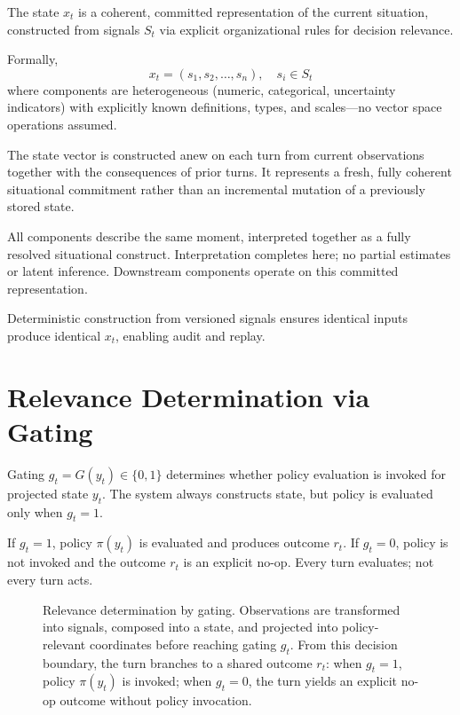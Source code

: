 \documentclass[11pt]{article}
\begin{document}
The state $x_t$ is a coherent, committed representation of the current situation, constructed from signals $S_t$ via explicit organizational rules for decision relevance.

Formally,
\begin{equation}
x_t = (s_1, s_2, \dots, s_n), \quad s_i \in S_t
\end{equation}
where components are heterogeneous (numeric, categorical, uncertainty indicators) with explicitly known definitions, types, and scales---no vector space operations assumed.

The state vector is constructed anew on each turn from current observations together with the consequences of prior turns. It represents a fresh, fully coherent situational commitment rather than an incremental mutation of a previously stored state.

All components describe the same moment, interpreted together as a fully resolved situational construct. Interpretation completes here; no partial estimates or latent inference. Downstream components operate on this committed representation.

Deterministic construction from versioned signals ensures identical inputs produce identical $x_t$, enabling audit and replay.

\section{Relevance Determination via Gating}

Gating $g_t = G(y_t) \in \{0,1\}$ determines whether policy evaluation is invoked for projected state $y_t$. The system always constructs state, but policy is evaluated only when $g_t = 1$.

If $g_t = 1$, policy $\pi(y_t)$ is evaluated and produces outcome $r_t$. If $g_t = 0$, policy is not invoked and the outcome $r_t$ is an explicit no-op. Every turn evaluates; not every turn acts.

\begin{figure}[H]
\centering

\caption{Relevance determination by gating. Observations are transformed into signals, composed into a state, and projected into policy-relevant coordinates before reaching gating $g_t$. From this decision boundary, the turn branches to a shared outcome $r_t$: when $g_t=1$, policy $\pi(y_t)$ is invoked; when $g_t=0$, the turn yields an explicit no-op outcome without policy invocation.}
\label{fig:esm-gating-pipeline}
\end{figure}
\end{document}
